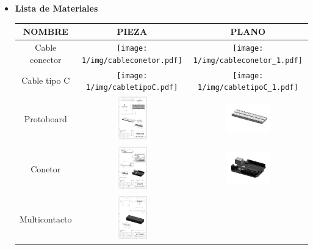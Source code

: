     
    \begin{itemize}
    \item \textbf{Lista de Materiales}  
    \begin{table} [H]
          
      \huge
      \tiny 
      \begin{tabular}   {| c |  c |  c | }
      
      \hline
      NOMBRE & PIEZA  & PLANO \\
      \hline 
      Cable conector &  \texttt{[image: 1/img/cableconetor.pdf]}  & 
       \texttt{[image: 1/img/cableconetor\_1.pdf]} \\
        \hline
        Cable tipo C &  \texttt{[image: 1/img/cabletipoC.pdf]}  & 
       \texttt{[image: 1/img/cabletipoC\_1.pdf]} \\
        \hline
      Protoboard &  \includegraphics[height=19mm]{1/img/protoboard.pdf}  & 
       \includegraphics[width=19mm]{1/img/protoboard_1.pdf} \\
        \hline
       Conetor &  \includegraphics[height=19mm]{1/img/Conector.pdf}  & 
       \includegraphics[width=19mm]{1/img/conector_1.pdf} \\
        \hline
        Multicontacto &  \includegraphics[height=19mm]{1/img/Multicontacto.pdf}  & 

\end{tabular}
\end{table}
\end{itemize}
